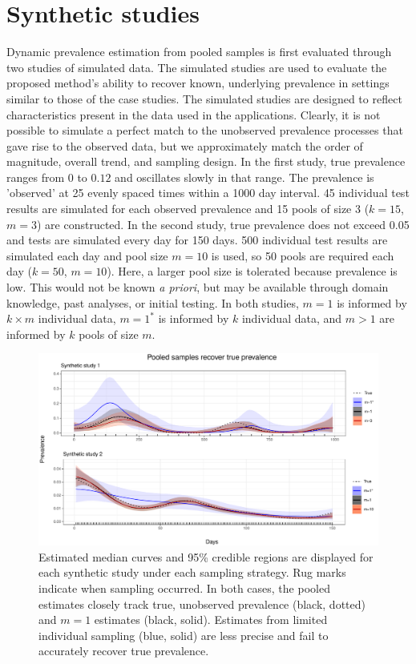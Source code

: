 \documentclass{article}
\begin{document}
\section{Synthetic studies}


Dynamic prevalence estimation from pooled samples is first evaluated through two studies of simulated data. The simulated studies are used to evaluate the proposed method's ability to recover known, underlying prevalence in settings similar to those of the case studies. The simulated studies are designed to reflect characteristics present in the data used in the applications. Clearly, it is not possible to simulate a perfect match to the unobserved prevalence processes that gave rise to the observed data, but we approximately match the order of magnitude, overall trend, and sampling design. In the first study, true prevalence ranges from $0$ to $0.12$ and oscillates slowly in that range. The prevalence is 'observed' at 25 evenly spaced times within a 1000 day interval. 45 individual test results are simulated for each observed prevalence and 15 pools of size 3 ($k=15$, $m=3$) are constructed. In the second study, true prevalence does not exceed 0.05 and tests are simulated every day for 150 days. 500 individual test results are simulated each day and pool size $m=10$ is used, so 50 pools are required each day ($k=50$, $m=10$). Here, a larger pool size is tolerated because prevalence is low. This would not be known\emph{ a priori}, but may be available through domain knowledge, past analyses, or initial testing. In both studies, $m=1$ is informed by $k\times m$ individual data, $m=1^*$ is informed by $k$ individual data, and $m>1$ are informed by $k$ pools of size $m$. 

\begin{figure}[ht!]
\centerline{\includegraphics[width=\textwidth]{Figure1.pdf}}
\caption{Estimated median curves and 95\% credible regions are displayed for each synthetic study under each sampling strategy. Rug marks indicate when sampling occurred. In both cases, the pooled estimates closely track true, unobserved prevalence (black, dotted) and $m=1$ estimates (black, solid). Estimates from limited individual sampling (blue, solid) are less precise and fail to accurately recover true prevalence. \label{fig1}}
\end{figure}
\end{document}
